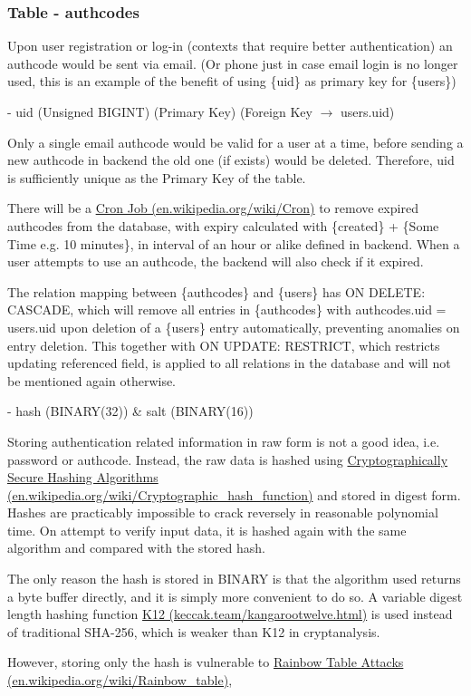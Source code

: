 \documentclass[12pt]{report}
\newcommand{\n}{\par}
\newcommand{\br}{\n\vspace{1 em}\n}
\begin{document}
\subsubsection{Table - authcodes} \label{data-layer.design.user-system.authcodes}
Upon user registration or log-in (contexts that require better authentication) an authcode would be sent via email.
(Or phone just in case email login is no longer used, this is an example of the benefit of using \{uid\} as primary key for \{users\})
\br
- uid (Unsigned BIGINT) (Primary Key) (Foreign Key $\rightarrow$ users.uid)\n
Only a single email authcode would be valid for a user at a time,
before sending a new authcode in backend the old one (if exists) would be deleted.
Therefore, uid is sufficiently unique as the Primary Key of the table.\n
There will be a \href{https://en.wikipedia.org/wiki/Cron}{Cron Job (en.wikipedia.org/wiki/Cron)} to remove expired authcodes from the database,
with expiry calculated with \{created\} + \{Some Time e.g. 10 minutes\},
in interval of an hour or alike defined in backend.
When a user attempts to use an authcode, the backend will also check if it expired.\n
The relation mapping between \{authcodes\} and \{users\} has ON DELETE: CASCADE,
which will remove all entries in \{authcodes\} with authcodes.uid = users.uid upon deletion of a \{users\} entry automatically,
preventing anomalies on entry deletion.
This together with ON UPDATE: RESTRICT, which restricts updating referenced field,
is applied to all relations in the database and will not be mentioned again otherwise.
\br
- hash (BINARY(32)) \& salt (BINARY(16))\n
Storing authentication related information in raw form is not a good idea, i.e. password or authcode.
Instead, the raw data is hashed using \href{https://en.wikipedia.org/wiki/Cryptographic_hash_function}{Cryptographically Secure Hashing Algorithms (en.wikipedia.org/wiki/Cryptographic\_hash\_function)} and stored in digest form.
Hashes are practicably impossible to crack reversely in reasonable polynomial time.
On attempt to verify input data, it is hashed again with the same algorithm and compared with the stored hash.\n
The only reason the hash is stored in BINARY is that the algorithm used returns a byte buffer directly,
and it is simply more convenient to do so.
A variable digest length hashing function \href{https://keccak.team/kangarootwelve.html}{K12 (keccak.team/kangarootwelve.html)} is used
instead of traditional SHA-256, which is weaker than K12 in cryptanalysis.\n
However, storing only the hash is vulnerable to \href{https://en.wikipedia.org/wiki/Rainbow_table}{Rainbow Table Attacks (en.wikipedia.org\-/wiki/Rainbow\_table)},
\end{document}
